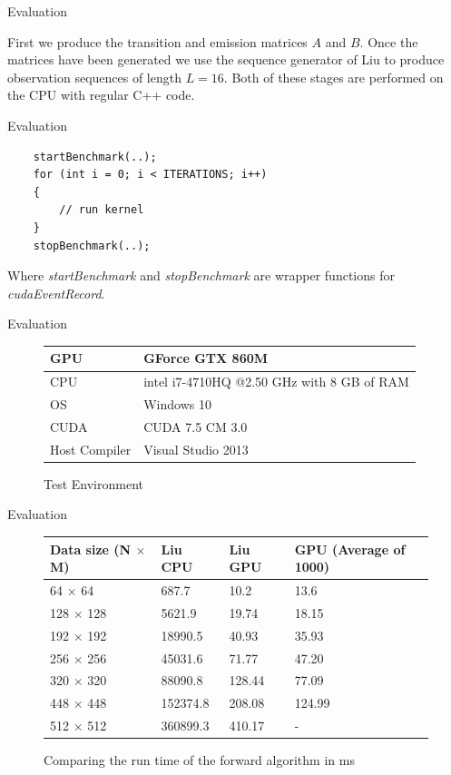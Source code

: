 \documentclass[11pt]{beamer}
\begin{document}
\begin{frame}{Evaluation}

 First we produce the transition and emission matrices $A$ and $B$. 
 Once the matrices have been generated we use the sequence generator of Liu to produce observation sequences of length $L = 16$. Both of these stages are performed on the CPU with regular C++ code.

\end{frame}

\begin{frame}[fragile]{Evaluation}

\begin{verbatim}
	startBenchmark(..);
	for (int i = 0; i < ITERATIONS; i++)
	{
		// run kernel
	}
	stopBenchmark(..);
\end{verbatim}
Where \textit{startBenchmark} and \textit{stopBenchmark} are wrapper functions for \textit{cudaEventRecord}.

\end{frame}

\begin{frame}{Evaluation}
\begin{figure}[H]
\centering
\begin{tabular}{|l|l|}
\hline
GPU &GForce GTX 860M \\ \hline
CPU & intel i7-4710HQ @2.50 GHz with 8 GB of RAM  \\ \hline
OS & Windows 10 \\ \hline
CUDA & CUDA 7.5 CM 3.0 \\ \hline
Host Compiler & Visual Studio 2013 \\ \hline

\end{tabular}

\caption{Test Environment}
\end{figure}
\end{frame}

\begin{frame}{Evaluation}
\begin{figure}[H]
\centering
\begin{tabular}{|l|l|l|l|}
\hline
Data size (N $\times$ M) & Liu CPU & Liu GPU & GPU (Average of 1000)\\ \hline
64 $\times$ 64 & 687.7 & 10.2 & 13.6 \\ \hline
128 $\times$ 128 & 5621.9 & 19.74 & 18.15 \\ \hline
192 $\times$ 192 & 18990.5 & 40.93 & 35.93 \\ \hline
256 $\times$ 256 & 45031.6 & 71.77 & 47.20 \\ \hline
320 $\times$ 320 & 88090.8 & 128.44 & 77.09 \\ \hline
448 $\times$ 448 & 152374.8 & 208.08 & 124.99 \\ \hline
512 $\times$ 512 & 360899.3 & 410.17 & - \\ \hline

\end{tabular}

\caption{Comparing the run time of the forward algorithm in ms}
\end{figure}
\end{frame}
\end{document}
